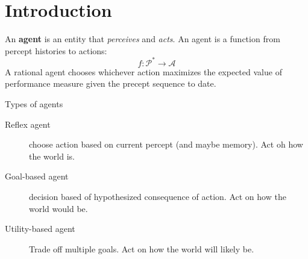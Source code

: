 \chapter{Introduction}
An \textbf{agent} is an entity that \textit{perceives} and \textit{acts}. An agent is a function from percept histories to actions:
\begin{equation}
    f : \mathcal{P}^\ast \to \mathcal{A}
\end{equation}
A rational agent chooses whichever action maximizes the expected value of performance measure given the precept sequence to date.

Types of agents
\begin{description}
    \item[Reflex agent] choose action based on current percept (and maybe memory). Act oh how the world is.
    \item[Goal-based agent] decision based of hypothesized consequence of action. Act on how the world would be.
    \item[Utility-based agent] Trade off multiple goals. Act on how the world will likely be.    
\end{description}